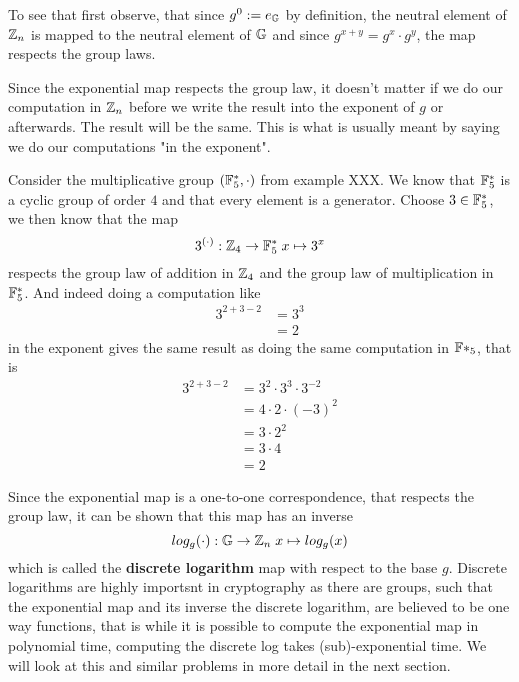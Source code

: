 To see that first observe, that since $g^0:=e_{\mathbb{G}}$ by definition, the neutral element of $\mathbb{Z}_n$ is mapped to the neutral element of $\mathbb{G}$ and since $g^{x+y}=g^x\cdot g^y$, the map respects the group laws.

Since the exponential map respects the group law, it doesn't matter if we do our computation in $\mathbb{Z}_n$ before we write the result into the exponent of $g$ or afterwards. The result will be the same. This is what is usually meant by saying we do our computations "in the exponent".
\begin{example} Consider the multiplicative group $(\mathbb{F}_{5}^*,\cdot)$ from example XXX. We know that $\mathbb{F}_{5}^*$ is a cyclic group of order $4$ and that every element is a generator. Choose $3\in\mathbb{F}_5^*$, we then know that the map
$$
3^{(\cdot)}: \mathbb{Z}_4 \to \mathbb{F}_5^* \; x \mapsto 3^x
$$
respects the group law of addition in $\mathbb{Z}_4$ and the group law of multiplication in $\mathbb{F}_5^*$.
And indeed doing a computation like
\begin{align*}
3^{2+3-2} &=3^{3}\\
          & = 2
\end{align*}
in the exponent gives the same result as doing the same computation in $\mathbb{F}*_5$, that is
\begin{align*}
3^{2+3-2} &= 3^2 \cdot 3^3 \cdot 3^{-2}\\
          &= 4\cdot 2 \cdot (-3)^2\\
          &= 3\cdot 2^2\\
          &= 3\cdot 4 \\
          &= 2
\end{align*}
\end{example}
Since the exponential map is a one-to-one correspondence, that respects the group law, it can be shown that this map has an inverse
\begin{equation}
log_g(\cdot): \mathbb{G} \to \mathbb{Z}_n\; x \mapsto log_g(x)
\end{equation}
which is called the \textbf{discrete logarithm} map with respect to the base $g$. Discrete logarithms are highly importsnt in cryptography as there are groups, such that the exponential map and its inverse the discrete logarithm, are believed to be one way functions, that is while it is possible to compute the exponential map in polynomial time, computing the discrete log takes (sub)-exponential time. We will look at this and similar problems in more detail in the next section.



